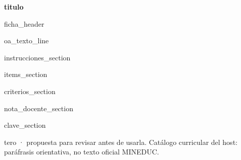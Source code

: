 \documentclass[11pt,a4paper]{article}
\begin{document}
{\LARGE\bfseries {{titulo}}}

\vspace{0.25em}
{{ficha_header}}

\vspace{0.5em}
{{oa_texto_line}}

{{instrucciones_section}}

{{items_section}}

{{criterios_section}}

{{nota_docente_section}}

{{clave_section}}

\vfill
{\footnotesize tero · propuesta para revisar antes de usarla. Catálogo curricular del host: paráfrasis orientativa, no texto oficial MINEDUC.}
\end{document}
